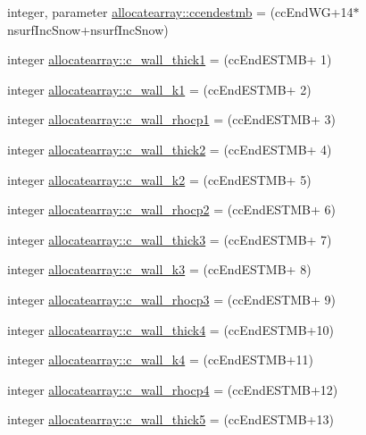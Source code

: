 \begin{DoxyCompactItemize}
\item 
integer, parameter \hyperlink{namespaceallocatearray_a4a8540d91a102b456a0b5064dcf32db1}{allocatearray\+::ccendestmb} = (cc\+End\+WG+14$\ast$nsurf\+Inc\+Snow+nsurf\+Inc\+Snow)
\item 
integer \hyperlink{namespaceallocatearray_a9fa538a9bf9934baec62b04d2254711b}{allocatearray\+::c\+\_\+wall\+\_\+thick1} = (cc\+End\+E\+S\+T\+MB+ 1)
\item 
integer \hyperlink{namespaceallocatearray_ac46d57de0eb86fe7eef4d466bbfabf40}{allocatearray\+::c\+\_\+wall\+\_\+k1} = (cc\+End\+E\+S\+T\+MB+ 2)
\item 
integer \hyperlink{namespaceallocatearray_a7df439fa2fe23b75ee91c800a099e0ea}{allocatearray\+::c\+\_\+wall\+\_\+rhocp1} = (cc\+End\+E\+S\+T\+MB+ 3)
\item 
integer \hyperlink{namespaceallocatearray_a20f484b05dbdface58628f54a4c31343}{allocatearray\+::c\+\_\+wall\+\_\+thick2} = (cc\+End\+E\+S\+T\+MB+ 4)
\item 
integer \hyperlink{namespaceallocatearray_adff19937786a50cb75fdd721405f84f4}{allocatearray\+::c\+\_\+wall\+\_\+k2} = (cc\+End\+E\+S\+T\+MB+ 5)
\item 
integer \hyperlink{namespaceallocatearray_af2c229fa0f3dc62614415cf32458b8a2}{allocatearray\+::c\+\_\+wall\+\_\+rhocp2} = (cc\+End\+E\+S\+T\+MB+ 6)
\item 
integer \hyperlink{namespaceallocatearray_ad6febb7b97a4695b1b6e64af1d01b39d}{allocatearray\+::c\+\_\+wall\+\_\+thick3} = (cc\+End\+E\+S\+T\+MB+ 7)
\item 
integer \hyperlink{namespaceallocatearray_ab7912b232fb3b39abf37efdcb2b7906c}{allocatearray\+::c\+\_\+wall\+\_\+k3} = (cc\+End\+E\+S\+T\+MB+ 8)
\item 
integer \hyperlink{namespaceallocatearray_ad97c8838bb89895527b446537b3ea2d1}{allocatearray\+::c\+\_\+wall\+\_\+rhocp3} = (cc\+End\+E\+S\+T\+MB+ 9)
\item 
integer \hyperlink{namespaceallocatearray_a00d3e8b6807cad69955658722fb6dc73}{allocatearray\+::c\+\_\+wall\+\_\+thick4} = (cc\+End\+E\+S\+T\+MB+10)
\item 
integer \hyperlink{namespaceallocatearray_ae4f8b8b11060d80676b09002f11a32fe}{allocatearray\+::c\+\_\+wall\+\_\+k4} = (cc\+End\+E\+S\+T\+MB+11)
\item 
integer \hyperlink{namespaceallocatearray_aa36297cd251e35b468d761ad93c91fa3}{allocatearray\+::c\+\_\+wall\+\_\+rhocp4} = (cc\+End\+E\+S\+T\+MB+12)
\item 
integer \hyperlink{namespaceallocatearray_a5730c33e608715fe74f0b0f0549c1634}{allocatearray\+::c\+\_\+wall\+\_\+thick5} = (cc\+End\+E\+S\+T\+MB+13)

\end{DoxyCompactItemize}
